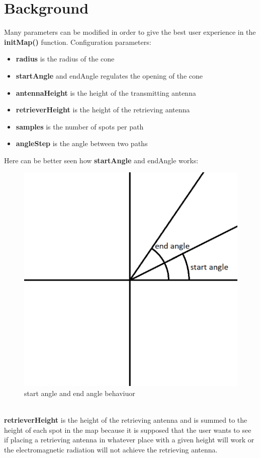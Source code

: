 \documentclass[peerreview]{IEEEtran}
\begin{document}
\section{Background}
Many parameters can be modified in order to give the best user experience in the \textbf{initMap()} function.
Configuration parameters:
\begin{itemize}
\item \textbf{radius} is the radius of the cone
\item \textbf{startAngle} and endAngle regulates the opening of the cone
\item \textbf{antennaHeight} is the height of the transmitting antenna
\item \textbf{retrieverHeight} is the height of the retrieving antenna
\item \textbf{samples} is the number of spots per path
\item \textbf{angleStep} is the angle between two paths
\end{itemize}
\pagebreak
Here can be better seen how \textbf{startAngle} and endAngle works:
\begin{figure}[!ht]
\centering
\includegraphics[width=0.8\columnwidth]{startangle} 
\caption{start angle and end angle behaviuor}
\label{fig_startangle}
\end{figure}
\\\textbf{retrieverHeight} is the height of the retrieving antenna and is summed to the height of each spot in the map because it is supposed that the user wants to see if placing a retrieving antenna in whatever place with a given height will work or the electromagnetic radiation will not achieve the retrieving antenna.
\end{document}
